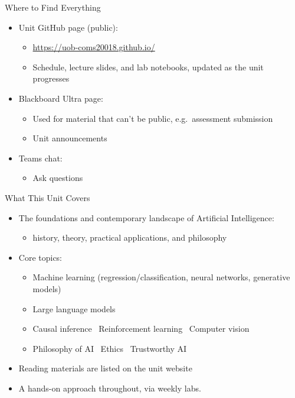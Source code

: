 \documentclass[10pt]{beamer}
\begin{document}
\begin{titledslide}{Where to Find Everything}

  \begin{itemize}
  \item Unit GitHub page (public):
    \begin{itemize}
    \item \href{https://uob-coms20018.github.io/}{https://uob-coms20018.github.io/}
    \item Schedule, lecture slides, and lab notebooks, updated as the unit
      progresses
    \end{itemize}
  \item Blackboard Ultra page:
    \begin{itemize}
    \item Used for material that can't be public, e.g.\ assessment
      submission
    \item Unit announcements
    \end{itemize}
  \item Teams chat:
    \begin{itemize}
    \item Ask questions
    \end{itemize}
  \end{itemize}

\end{titledslide}
\begin{titledslide}{What This Unit Covers}

  \begin{itemize}
  \item The foundations and contemporary landscape of Artificial
    Intelligence:
    \begin{itemize}
    \item history, theory, practical applications, and philosophy
    \end{itemize}
  \item Core topics:
    \begin{itemize}
    \item Machine learning (regression/classification, neural networks,
      generative models)
    \item Large language models
    \item Causal inference \textperiodcentered\ Reinforcement learning
      \textperiodcentered\ Computer vision
    \item Philosophy of AI \textperiodcentered\ Ethics \textperiodcentered\
      Trustworthy AI
    \end{itemize}
  \item Reading materials are listed on the unit website
  \item A hands-on approach throughout, via weekly labs.
  \end{itemize}

\end{titledslide}
\end{document}
